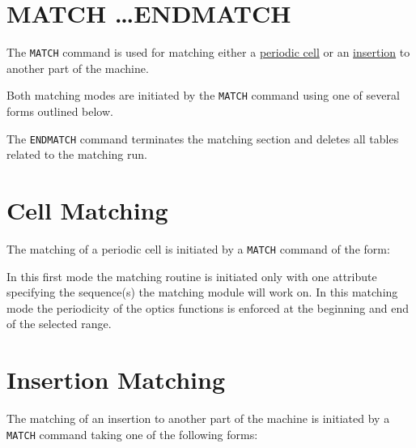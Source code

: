 

%




\section{MATCH \ldots ENDMATCH}
\label{sec:match}\label{sec:endmatch}

The \texttt{MATCH} command is used for matching either a \hyperref[sec:cell]{periodic cell}
or an \hyperref[sec:insertion]{insertion} to another part of the machine. 

Both matching modes are initiated by the \texttt{MATCH} command using
one of several forms outlined below. 

The \texttt{ENDMATCH} command terminates the matching section and deletes
all tables related to the matching run. 


\section{Cell Matching}
\label{sec:cell}

The matching of a periodic cell is initiated by a \texttt{MATCH} command of
the form:


In this first mode the matching routine is initiated only with one
attribute specifying the sequence(s) the matching module will work
on. In this matching mode the periodicity of the optics functions is
enforced at the beginning and end of the selected range. 
    


\section{Insertion Matching}
\label{sec:insertion}
The matching of an insertion to another part of the machine is initiated
by a \texttt{MATCH} command taking one of the following forms:

